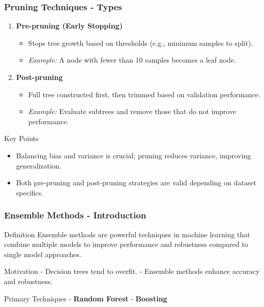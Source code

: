\documentclass[aspectratio=169]{beamer}
\begin{document}
\begin{frame}[fragile]
    \frametitle{Pruning Techniques - Types}
    \begin{enumerate}
        \item \textbf{Pre-pruning (Early Stopping)}
            \begin{itemize}
                \item Stops tree growth based on thresholds (e.g., minimum samples to split).
                \item \textit{Example:} A node with fewer than 10 samples becomes a leaf node.
            \end{itemize}
        \item \textbf{Post-pruning}
            \begin{itemize}
                \item Full tree constructed first, then trimmed based on validation performance.
                \item \textit{Example:} Evaluate subtrees and remove those that do not improve performance.
            \end{itemize}
    \end{enumerate}
    
    \begin{block}{Key Points}
        \begin{itemize}
            \item Balancing bias and variance is crucial; pruning reduces variance, improving generalization.
            \item Both pre-pruning and post-pruning strategies are valid depending on dataset specifics.
        \end{itemize}
    \end{block}
\end{frame}

\begin{frame}[fragile]
    \frametitle{Ensemble Methods - Introduction}
    \begin{block}{Definition}
        Ensemble methods are powerful techniques in machine learning that combine multiple models to improve performance and robustness compared to single model approaches.
    \end{block}
    
    \begin{block}{Motivation}
        - Decision trees tend to overfit.
        - Ensemble methods enhance accuracy and robustness.
    \end{block}

    \begin{block}{Primary Techniques}
        - \textbf{Random Forest}
        - \textbf{Boosting}
    \end{block}
\end{frame}
\end{document}
